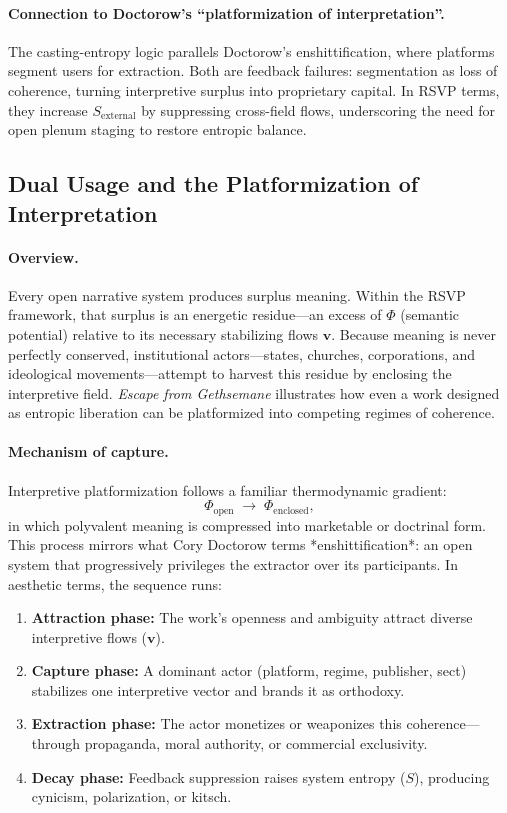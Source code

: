 \documentclass[12pt]{article}
\begin{document}
\paragraph{Connection to Doctorow’s “platformization of interpretation”.}
The casting-entropy logic parallels Doctorow’s enshittification, where platforms segment users for extraction. Both are feedback failures: segmentation as loss of coherence, turning interpretive surplus into proprietary capital. In RSVP terms, they increase \(S_{\text{external}}\) by suppressing cross-field flows, underscoring the need for open plenum staging to restore entropic balance.

\subsection{Dual Usage and the Platformization of Interpretation}
\label{sec:dual-use-platformization}

\paragraph{Overview.}
Every open narrative system produces surplus meaning.  
Within the RSVP framework, that surplus is an energetic residue—an excess of \(\Phi\) (semantic potential) relative to its necessary stabilizing flows \(\mathbf v\).  
Because meaning is never perfectly conserved, institutional actors—states, churches, corporations, and ideological movements—attempt to harvest this residue by enclosing the interpretive field.  
\emph{Escape from Gethsemane} illustrates how even a work designed as entropic liberation can be platformized into competing regimes of coherence.

\paragraph{Mechanism of capture.}
Interpretive platformization follows a familiar thermodynamic gradient:
\[
\Phi_{\text{open}} \;\longrightarrow\; \Phi_{\text{enclosed}},
\]
in which polyvalent meaning is compressed into marketable or doctrinal form.  
This process mirrors what Cory Doctorow terms *enshittification*: an open system that progressively privileges the extractor over its participants.  
In aesthetic terms, the sequence runs:

\begin{enumerate}[label=(\roman*)]
  \item \textbf{Attraction phase:}  The work’s openness and ambiguity attract diverse interpretive flows (\(\mathbf v\)).  
  \item \textbf{Capture phase:}  A dominant actor (platform, regime, publisher, sect) stabilizes one interpretive vector and brands it as orthodoxy.  
  \item \textbf{Extraction phase:}  The actor monetizes or weaponizes this coherence—through propaganda, moral authority, or commercial exclusivity.  
  \item \textbf{Decay phase:}  Feedback suppression raises system entropy (\(S\)), producing cynicism, polarization, or kitsch.
\end{enumerate}
\end{document}
